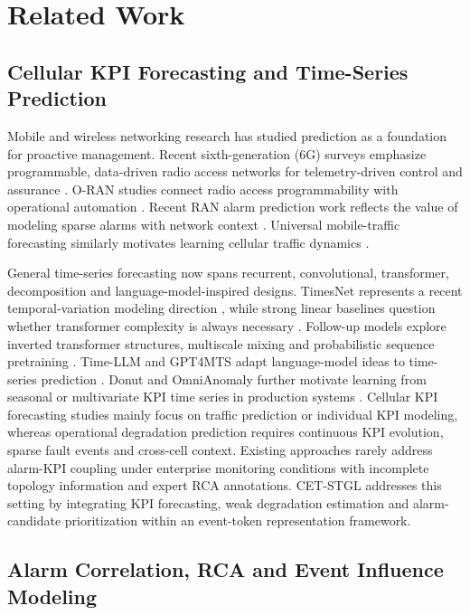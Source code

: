 \section{Related Work}
\label{sec:related_work}

\subsection{Cellular KPI Forecasting and Time-Series Prediction}

Mobile and wireless networking research has studied prediction as a foundation for proactive management. Recent sixth-generation (6G) surveys emphasize programmable, data-driven radio access networks for telemetry-driven control and assurance \cite{wang2023road6g}. O-RAN studies connect radio access programmability with operational automation \cite{polese2023oran}. Recent RAN alarm prediction work reflects the value of modeling sparse alarms with network context \cite{li2025ranalarm}. Universal mobile-traffic forecasting similarly motivates learning cellular traffic dynamics \cite{chai2025uomo}.

General time-series forecasting now spans recurrent, convolutional, transformer, decomposition and language-model-inspired designs. TimesNet represents a recent temporal-variation modeling direction \cite{wu2023timesnet}, while strong linear baselines question whether transformer complexity is always necessary \cite{zeng2023transformers}. Follow-up models explore inverted transformer structures, multiscale mixing and probabilistic sequence pretraining \cite{liu2024itransformer,wang2024timemixer,ansari2024chronos}. Time-LLM and GPT4MTS adapt language-model ideas to time-series prediction \cite{jin2024timellm,jia2024gpt4mts}. Donut and OmniAnomaly further motivate learning from seasonal or multivariate KPI time series in production systems \cite{xu2018donut,su2019omni}. Cellular KPI forecasting studies mainly focus on traffic prediction or individual KPI modeling, whereas operational degradation prediction requires continuous KPI evolution, sparse fault events and cross-cell context. Existing approaches rarely address alarm-KPI coupling under enterprise monitoring conditions with incomplete topology information and expert RCA annotations. CET-STGL addresses this setting by integrating KPI forecasting, weak degradation estimation and alarm-candidate prioritization within an event-token representation framework.

\subsection{Alarm Correlation, RCA and Event Influence Modeling}

